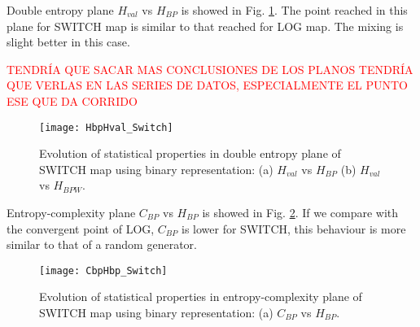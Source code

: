 Double entropy plane $H_{val}$ vs $H_{BP}$ is showed in Fig. \ref{fig:SWITCH_HH}.
The point reached in this plane for SWITCH map is similar to that reached for LOG map.
The mixing is slight better in this case.

\textcolor{red}{TENDRÍA QUE SACAR MAS CONCLUSIONES DE LOS PLANOS TENDRÍA QUE VERLAS EN LAS SERIES DE DATOS, ESPECIALMENTE EL PUNTO ESE QUE DA CORRIDO}

\begin{figure}
	\texttt{[image: HbpHval\_Switch]}
	\caption{Evolution of statistical properties in double entropy plane of SWITCH map using binary representation: (a) $H_{val}$ vs $H_{BP}$ (b) $H_{val}$ vs $H_{BPW}$.}
	\label{fig:SWITCH_HH}
\end{figure}

Entropy-complexity plane $C_{BP}$ vs $H_{BP}$ is showed in Fig. \ref{fig:SWITCH_HC}.
If we compare with the convergent point of LOG, $C_{BP}$ is lower for SWITCH, this behaviour is more similar to that of a random generator.

\begin{figure}
	\texttt{[image: CbpHbp\_Switch]}
	\caption{Evolution of statistical properties in entropy-complexity plane of SWITCH map using binary representation: (a) $C_{BP}$ vs $H_{BP}$.}
	\label{fig:SWITCH_HC}
\end{figure}
